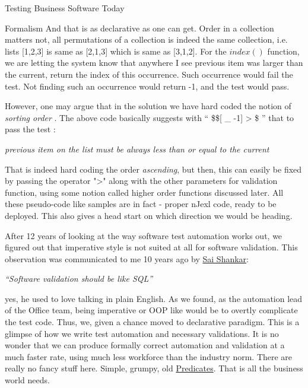 \begin{section}{Testing Business Software Today}
\begin{subsection}{Formalism}
And that is as declarative as one can get. Order in a collection matters not, all permutations of a collection is indeed the same collection, i.e. lists [1,2,3] is same as [2,1,3] which is same as [3,1,2]. For the $index()$ function, we are letting the system know that anywhere I see previous item was larger than the current, return the index of this occurrence. Such occurrence would fail the test. Not finding such an occurrence would return -1, and the test would pass.

However, one may argue that in the solution we have hard coded the notion of \emph{sorting order} . The above code  basically suggests with 
`` \$\$[ \_ -1]  > \$ ''  that to pass the test :

\begin{center}
\emph{ previous item on the list must be always less than or equal to the current }
\end{center}

That is indeed hard coding the order \emph{ascending},  but then, this can easily be fixed by passing the operator 
">" along with the other parameters for validation function, using some notion called higher order functions discussed later. 
All these pseudo-code like samples are in fact - proper nJexl code, ready to be deployed. This also gives a head start on which direction we would be heading.
\end{subsection}

After 12 years of looking at the way  software test automation works out, we figured out that imperative style is not suited at all for software validation. This observation was communicated to me 10 years ago by 
\href{https://www.linkedin.com/in/sai-shankar-a3891418}{Sai Shankar}:

\begin{center}
\emph{``Software validation should be like SQL''}
\end{center}
yes, he used to love talking in plain English.
As we found, as the automation lead of the Office team, being imperative or OOP like would be to overtly  complicate the test code. Thus, we, given a chance  moved to declarative paradigm. This is a glimpse of how we write test automation and necessary validations. It is no wonder that we can produce formally correct automation and validation at a much faster rate, using much less workforce than the industry norm. There are really no fancy stuff here. Simple, grumpy, old 
\href{https://en.wikipedia.org/wiki/Predicate_logic}{Predicates}.  That is all the business world needs. 
\end{section}


